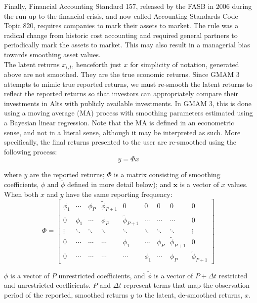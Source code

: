 \documentclass{ledger}
\begin{document}
Finally, Financial Accounting Standard 157, released by the FASB in 2006 during the run-up to the financial crisis, and now called Accounting Standards Code Topic 820, requires companies to mark their assets to market. The rule was a radical change from historic cost accounting and required general partners to periodically mark the assets to market. This may also result in a managerial bias towards smoothing asset values. \\

The latent returns $x_{i,t}$, henceforth just $x$ for simplicity of notation, generated above are not smoothed. They are the true economic returns. Since GMAM 3 attempts to mimic true reported returns, we must re-smooth the latent returns to reflect the reported returns so that investors can appropriately compare their investments in Alts with publicly available investments. In GMAM 3, this is done using a moving average (MA) process with smoothing parameters estimated using a Bayesian linear regression. Note that the MA is defined in an econometric sense, and not in a literal sense, although it may be interpreted as such. More specifically, the final returns presented to the user are re-smoothed using the following process:
\begin{equation}
\label{eq:y}
	y=\Phi x
\end{equation}

where $y$ are the reported returns; $\Phi$ is a matrix consisting of smoothing coefficients, $\phi$ and $\tilde{\phi}$ defined in more detail below); and $\mathbf{x}$ is a vector of $x$ values. When both $x$ and $y$ have the same reporting frequency:
\begin{equation}
\label{eq:phi}
	\Phi =
	\begin{bmatrix}
		\phi_{1} & \cdots & \phi_{P} & \tilde{\phi}_{P+1} & 0 & 0 & 0 & 0 & 0\\
		0 & \phi_{1} & \cdots & \phi_{P} & \tilde{\phi}_{P+1} & \cdots & \cdots & \cdots & 0\\
		\vdots & \ddots & \ddots & \ddots & \ddots & \ddots & \ddots & \ddots & \vdots\\
		0 & \cdots & \cdots & \cdots & \phi_{1} & \cdots & \phi_{P} & \tilde{\phi}_{P+1} & 0\\
		0 & \cdots & \cdots & \cdots & \cdots & \phi_{1} & \cdots & \phi_{P} & \tilde{\phi}_{P+1}
	\end{bmatrix} 
\end{equation}

$\phi$ is a vector of $P$ unrestricted coefficients, and $\tilde{\phi}$ is a vector of $P + \Delta t$ restricted and unrestricted coefficients. $P$ and $\Delta t$ represent terms that map the observation period of the reported, smoothed returns $y$ to the latent, de-smoothed returns, $x$. \\
\end{document}
